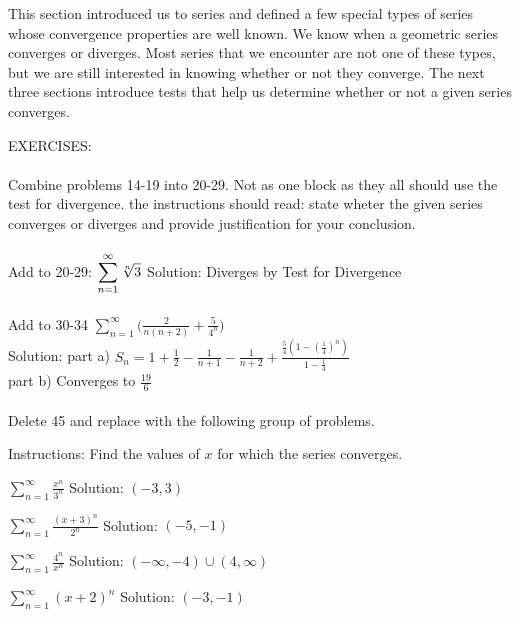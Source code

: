 \documentclass[10pt]{article}
\newcommand{\ds}{\displaystyle}
\begin{document}
This section introduced us to series and defined a few special types of series whose convergence properties are well known. We know when a geometric series converges or diverges. Most series that we encounter are not one of these types, but we are still interested in knowing whether or not they converge. The next three sections introduce tests that help us determine whether or not a given series converges. 


EXERCISES: \\ \\
Combine problems 14-19 into 20-29. Not as one block as they all should use the test for divergence. the instructions should read: state wheter the given series converges or diverges and provide justification for your conclusion. \\ \\

	Add to 20-29: $\ds \sum_{n=1}^\infty \root n \of 3$			Solution: Diverges by Test for Divergence  \\ \\

Add to 30-34   $\ds \sum_{n=1}^\infty \biggl(\frac{2}{n(n+2)} +\frac{5}{4^n}\biggr)$  \\
				Solution: part a) $S_n=1+\frac12-\frac{1}{n+1}-\frac{1}{n+2}+\frac{\frac54(1-(\frac14)^n)}{1-\frac14}$  \\
					    part b) Converges to $\frac{19}{6}$  \\ \\

Delete 45 and replace with the following group of problems.

Instructions:  Find the values of $x$ for which the series converges.

$\ds \sum_{n=1}^\infty \frac{x^n}{3^n}$			Solution: $(-3,3)$

$\ds \sum_{n=1}^\infty \frac{(x+3)^n}{2^n}$		Solution: $(-5,-1)$

$\ds \sum_{n=1}^\infty \frac{4^n}{x^n}$			Solution: $(-\infty,-4)\cup (4,\infty)$

$\ds \sum_{n=1}^\infty (x+2)^n$				Solution: $(-3,-1)$
\end{document}
